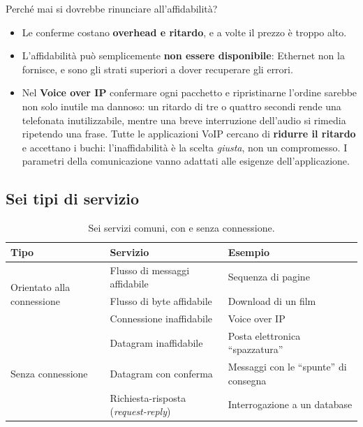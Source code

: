 Perché mai si dovrebbe rinunciare all'affidabilità?

\begin{itemize}
    \item Le conferme costano \textbf{overhead e ritardo}, e a volte il prezzo è troppo alto.
    \item L'affidabilità può semplicemente \textbf{non essere disponibile}: Ethernet non la fornisce, e
          sono gli strati superiori a dover recuperare gli errori.
    \item Nel \textbf{Voice over IP} confermare ogni pacchetto e ripristinarne l'ordine sarebbe non solo inutile ma
          dannoso: un ritardo di tre o quattro secondi rende una telefonata inutilizzabile, mentre una breve
          interruzione dell'audio si rimedia ripetendo una frase. Tutte le applicazioni VoIP cercano di
          \textbf{ridurre il ritardo} e accettano i buchi: l'inaffidabilità è la scelta \emph{giusta}, non un
          compromesso. I parametri della comunicazione vanno adattati alle esigenze dell'applicazione.
\end{itemize}


\subsection{Sei tipi di servizio}

\begin{table}[H]
\centering
\begin{tabular}{lll}
\toprule
\textbf{Tipo} & \textbf{Servizio} & \textbf{Esempio} \\
\midrule
\multirow{3}{*}{Orientato alla connessione}
  & Flusso di messaggi affidabile & Sequenza di pagine \\
  & Flusso di byte affidabile & Download di un film \\
  & Connessione inaffidabile & Voice over IP \\
\midrule
\multirow{3}{*}{Senza connessione}
  & Datagram inaffidabile & Posta elettronica ``spazzatura'' \\
  & Datagram con conferma & Messaggi con le ``spunte'' di consegna \\
  & Richiesta-risposta (\emph{request-reply}) & Interrogazione a un database \\
\bottomrule
\end{tabular}
\caption{Sei servizi comuni, con e senza connessione.}
\end{table}

